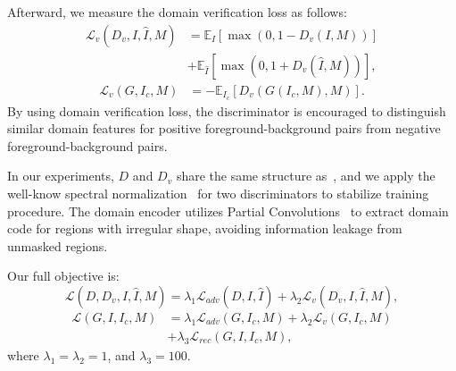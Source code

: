 \documentclass[final]{cvpr}
\begin{document}
Afterward, we measure the domain verification loss as follows: 
\begin{equation}
\label{equ:ver_loss_d_hinge}
\begin{split}
\mathcal{L}_{v}(D_{v}, I, \hat{I}, M) &= \mathbb{E}_{I}[\max(0, 1-D_{v}(I, M))] \\
&+ \mathbb{E}_{\hat{I}}[\max(0, 1+D_{v}(\hat{I}, M))],
\end{split}
\end{equation}
\begin{equation}
\label{equ:ver_loss_g_hinge}
\begin{split}
\mathcal{L}_{v}(G, I_{c}, M) &= -\mathbb{E}_{I_{c}}[D_{v}(G(I_{c}, M), M)].
\end{split}
\end{equation}
By using domain verification loss, the discriminator is encouraged to distinguish similar domain features for positive foreground-background pairs from negative foreground-background pairs. 

In our experiments, $D$ and $D_{v}$ share the same structure as~\cite{cong2020dovenet}, and we apply the well-know spectral normalization~\cite{miyato2018spectral} for two discriminators to stabilize training procedure. The domain encoder utilizes Partial Convolutions~\cite{liu2018image} to extract domain code for regions with irregular shape, avoiding information leakage from unmasked regions. 


Our full objective is: 
\begin{equation}
\label{equ:full_objective_d}
\mathcal{L}(D, D_{v}, I, \hat{I}, M) = \lambda_{1}\mathcal{L}_{adv}(D, I, \hat{I})
+ \lambda_{2}\mathcal{L}_{v}(D_{v}, I, \hat{I}, M),
\end{equation}
\begin{equation}
\label{equ:full_objective_g}
\begin{split}
\mathcal{L}(G, I, I_{c}, M) &= \lambda_{1}\mathcal{L}_{adv}(G, I_{c}, M) + \lambda_{2}\mathcal{L}_{v}(G, I_{c}, M) \\
&+ \lambda_{3}\mathcal{L}_{rec}(G, I, I_{c}, M), 
\end{split}
\end{equation}
where $\lambda_{1}=\lambda_{2}=1$, and $\lambda_{3}=100$. 
\end{document}
